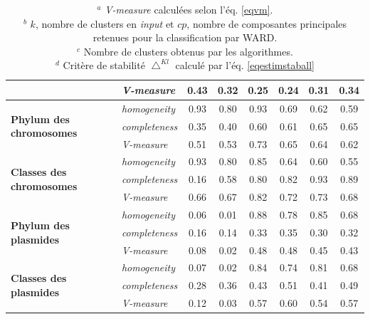 \begin{table}
\begin{tabular}{l|l|cc|cc|cc}
       & \textit{V-measure} & 0.43 & 0.32 & 0.25 & 0.24 & 0.31 & 0.34\\
      \hline
      \multirow{3}{*}{\textbf{Phylum des chromosomes}} & \textit{homogeneity} & 0.93 & 0.80 & 0.93 & 0.69 & 0.62 & 0.59 \\
       &\textit{completeness} & 0.35 & 0.40 & 0.60 & 0.61 & 0.65 & 0.65\\
       &\textit{V-measure} & 0.51 & 0.53 & 0.73 & 0.65 & 0.64 & 0.62\\
      \hline
      \multirow{3}{*}{\textbf{Classes des chromosomes}} & \textit{homogeneity} & 0.93 & 0.80 & 0.85 & 0.64 & 0.60 & 0.55 \\
       &\textit{completeness} & 0.16 & 0.58 & 0.80 & 0.82 & 0.93 & 0.89\\
       &\textit{V-measure} & 0.66 & 0.67 & 0.82 & 0.72 & 0.73 & 0.68\\
      \hline
      \multirow{3}{*}{\textbf{Phylum des plasmides}} & \textit{homogeneity} & 0.06 & 0.01 & 0.88 & 0.78 & 0.85 & 0.68 \\
       &\textit{completeness} & 0.16 & 0.14 & 0.33 & 0.35 & 0.30 & 0.32\\
       &\textit{V-measure} & 0.08 & 0.02 & 0.48 & 0.48 & 0.45 & 0.43\\
      \hline
      \multirow{3}{*}{\textbf{Classes des plasmides}} & \textit{homogeneity} & 0.07 & 0.02 & 0.84 & 0.74 & 0.81 & 0.68 \\
       &\textit{completeness} & 0.28 & 0.36 & 0.43 & 0.51& 0.41& 0.49\\
       &\textit{V-measure} & 0.12 & 0.03 & 0.57 & 0.60 & 0.54 & 0.57\\
      \hline
      \end{tabular}
      \captionsetup{labelsep=space,justification=justified,singlelinecheck=off}
      \vspace{0.5cm}
\caption*{$^{a}$ \textit{V-measure} calculées selon l'éq. \ref{eqvm}. \\ $^{b}$ $k$, nombre de clusters en \textit{input} et  $cp$, nombre de composantes principales retenues pour la classification par WARD. \\ $^{c}$ Nombre de clusters obtenus par les algorithmes.\\ $^{d}$ Critère de stabilité $\bigtriangleup^{Kl}$ calculé par l'éq. \ref{eqestimstaball}}
\captionsetup{}
\end{table}


